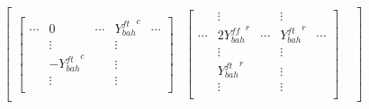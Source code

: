 \documentclass{article}
\begin{document}
\[\begin{bmatrix}
\begin{bmatrix}
        \cdots  & 0                 & \cdots & {Y^{ft}_{bah}}^c     & \cdots\\
                & \vdots            &        & \vdots               &              \\
                & -{Y^{ft}_{bah}}^c &        & \vdots               &              \\
                & \vdots            &        & \vdots               &              \\
    \end{bmatrix} &
    \begin{bmatrix}
                & \vdots                &        & \vdots           &              \\
        \cdots  & 2 {Y^{ff}_{bah}}^r    & \cdots & {Y^{ft}_{bah}}^r & \cdots       \\
                & \vdots                &        & \vdots           &              \\
                & {Y^{ft}_{bah}}^r      &        & \vdots           &              \\
                & \vdots                &        & \vdots           &              \\
    \end{bmatrix} &
    \end{bmatrix}
\]
\end{document}
